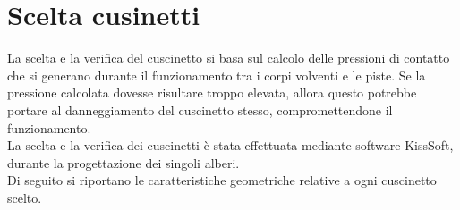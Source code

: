 \section{Scelta cusinetti}
La scelta e la verifica del cuscinetto si basa sul calcolo delle pressioni di contatto che si generano durante il funzionamento tra i corpi volventi e le piste. Se la pressione calcolata dovesse risultare troppo elevata, allora questo potrebbe portare al danneggiamento del cuscinetto stesso, compromettendone il funzionamento.\\
La scelta e la verifica dei cuscinetti è stata effettuata mediante software KissSoft, durante la progettazione dei singoli alberi. \\
Di seguito si riportano le caratteristiche geometriche relative a ogni cuscinetto scelto. \\
\\
